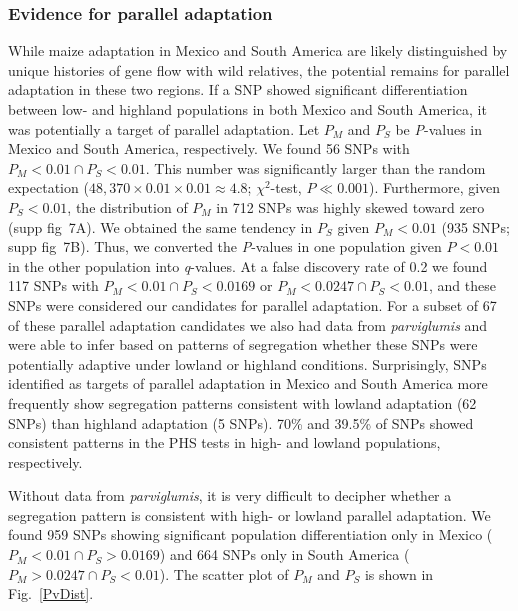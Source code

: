 {{\subsubsection{Evidence for parallel adaptation}

While maize adaptation in Mexico and South America are likely distinguished by unique histories of gene flow with wild relatives, the potential remains for parallel adaptation in these two regions.  If a SNP showed significant differentiation between low- and highland populations in both Mexico and South America, it was potentially a target of parallel adaptation.  
Let $P_M$ and $P_S$ be \emph{P}-values in Mexico and South America, respectively.
We found 56 SNPs with $P_M<0.01 \cap  P_S<0.01$.  
This number  was significantly larger than the random expectation ($48,370\times 0.01 \times 0.01 \approx 4.8$; $\chi^2$-test, $P\ll0.001$).  
Furthermore, given $P_S<0.01$, the distribution of $P_M$ in 712 SNPs was highly skewed toward zero (supp fig~7A).  We obtained the same tendency in $P_S$ given $P_M<0.01$ (935 SNPs; supp fig~7B).  Thus, we converted the \emph{P}-values in one population given $P<0.01$ in the other population into \emph{q}-values.  
At a false discovery rate of 0.2 we found 117 SNPs with $P_M<0.01 \cap P_S < 0.0169$ or $P_M<0.0247 \cap P_S < 0.01$, and these SNPs were considered our candidates for parallel adaptation.
For a subset of 67 of these parallel adaptation candidates we also had data from \emph{parviglumis} and were able to infer based on patterns of segregation whether these SNPs were potentially adaptive under lowland or highland conditions.  Surprisingly, SNPs identified as targets of parallel adaptation in Mexico and South America more frequently show segregation patterns consistent with lowland adaptation (62 SNPs) than highland adaptation (5 SNPs).
70\% and 39.5\% of SNPs showed consistent patterns in the PHS tests in high- and lowland populations, respectively.

Without data from \emph{parviglumis}, it is very difficult to decipher whether a segregation pattern is consistent with high- or lowland parallel adaptation.  
We found 959 SNPs showing significant population differentiation only in Mexico ($P_M<0.01 \cap P_S > 0.0169$) and 664 SNPs only in South America  ($P_M>0.0247 \cap P_S < 0.01$).  The scatter plot of $P_M$ and $P_S$ is shown in Fig.~\ref{PvDist}.  

}}
